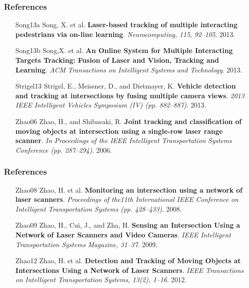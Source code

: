 \documentclass{beamer}
\begin{document}
\frame
{
	\frametitle{References}
		\footnotesize{
	\begin{itemize}[leftmargin=.6in]
		\item [Song13a] Song, X. et al. \textbf{Laser-based tracking of multiple interacting pedestrians via on-line learning}. \textit{Neurocomputing, 115, 92–105}. 2013.
		\item [Song13b] Song,X. et al. \textbf{An Online System for Multiple Interacting Targets Tracking: Fusion of Laser and Vision, Tracking and Learning}. \textit{ACM Transactions on Intelligent Systems and Technology}. 2013.
		\item [Strigel13] Strigel, E., Meissner, D., and Dietmayer, K. \textbf{Vehicle detection and tracking at intersections by fusing multiple camera views}. \textit{2013 IEEE Intelligent Vehicles Symposium (IV) (pp. 882–887)}. 2013.
		\item [Zhao06] Zhao, H., and Shibasaki, R. \textbf{Joint tracking and classification of moving objects at intersection using a single-row laser range scanner}. \textit{In Proceedings of the IEEE Intelligent Transportation Systems Conference (pp. 287–294)}. 2006.
	\end{itemize}	
	}
}

\frame
{
	\frametitle{References}
		\footnotesize{
	\begin{itemize}[leftmargin=.6in]
		\item [Zhao08] Zhao, H. et al.\textbf{ Monitoring an intersection using a network of laser scanners}. \textit{Proceedings of the11th International IEEE Conference on Intelligent Transportation Systems (pp. 428–433)}. 2008.
		\item [Zhao09] Zhao, H., Cui, J., and Zha, H. \textbf{Sensing an Intersection Using a Network of Laser Scanners and Video Cameras}. \textit{IEEE Intelligent Transportation Systems Magazine, 31–37}. 2009.
		\item [Zhao12] Zhao, H. et al. \textbf{Detection and Tracking of Moving Objects at Intersections Using a Network of Laser Scanners}. \textit{IEEE Transactions on Intelligent Transportation Systems, 13(2), 1–16}. 2012.

	\end{itemize}	
	}
}

%
%



%
%
%
%
\end{document}
